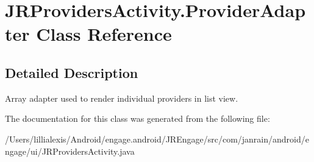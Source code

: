 \hypertarget{classcom_1_1janrain_1_1android_1_1engage_1_1ui_1_1_j_r_providers_activity_1_1_provider_adapter}{
\section{JRProvidersActivity.ProviderAdapter Class Reference}
\label{classcom_1_1janrain_1_1android_1_1engage_1_1ui_1_1_j_r_providers_activity_1_1_provider_adapter}
}


\subsection{Detailed Description}
Array adapter used to render individual providers in list view. 

The documentation for this class was generated from the following file:\begin{DoxyCompactItemize}
\item 
/Users/lillialexis/Android/engage.android/JREngage/src/com/janrain/android/engage/ui/JRProvidersActivity.java\end{DoxyCompactItemize}
